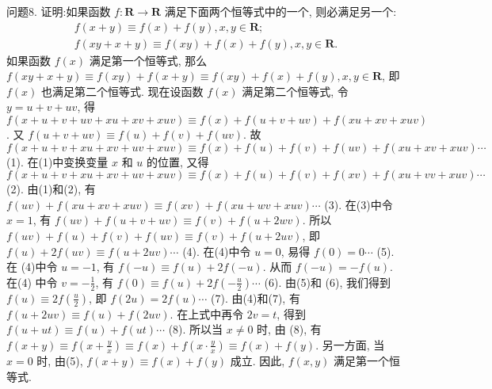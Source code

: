 问题8. 证明:如果函数 $f: \mathbf{R} \rightarrow \mathbf{R}$ 满足下面两个恒等式中的一个, 则必满足另一个:
$$
\begin{gathered}
f(x+y) \equiv f(x)+f(y), x, y \in \mathbf{R} ; \\
f(x y+x+y) \equiv f(x y)+f(x)+f(y), x, y \in \mathbf{R} .
\end{gathered}
$$
如果函数 $f(x)$ 满足第一个恒等式, 那么 $f(x y+x+y) \equiv f(x y)+ f(x+y) \equiv f(x y)+f(x)+f(y), x, y \in \mathbf{R}$, 即 $f(x)$ 也满足第二个恒等式.
现在设函数 $f(x)$ 满足第二个恒等式, 令 $y=u+v+u v$, 得 $f(x+u+v+u v+x u+x v+x u v) \equiv f(x)+f(u+v+u v)+f(x u+x v+x u v)$. 又 $f(u+ v+u v) \equiv f(u)+f(v)+f(u v)$. 故 $f(x+u+v+x u+x v+u v+x u v) \equiv f(x)+f(u)+f(v)+f(u v)+f(x u+x v+x u v) \cdots$ (1). 在(1)中变换变量 $x$ 和 $u$ 的位置, 又得 $f(x+u+v+x u+x v+u v+x u v) \equiv f(x)+f(u)+f(v)+ f(x v)+f(x u+v v+x u v) \cdots$ (2). 由(1)和(2), 有 $f(u v)+f(x u+x v+x u v) \equiv f(x v)+f(x u+w v+x u v) \cdots$ (3). 在(3)中令 $x=1$, 有 $f(u v)+f(u+v+u v) \equiv f(v)+f(u+2 w v)$. 所以 $f(u v)+f(u)+f(v)+f(u v) \equiv f(v)+f(u+2 u v)$, 即 $f(u)+2 f(u v) \equiv f(u+2 u v) \cdots$ (4). 在(4)中令 $u=0$, 易得 $f(0)=0 \cdots$ (5). 在 (4)中令 $u=-1$, 有 $f(-u) \equiv f(u)+2 f(-u)$. 从而 $f(-u)=-f(u)$. 在(4) 中令 $v=-\frac{1}{2}$, 有 $f(0) \equiv f(u)+2 f\left(-\frac{u}{2}\right) \cdots$ (6). 由(5)和 (6), 我们得到 $f(u) \equiv 2 f\left(\frac{u}{2}\right)$, 即 $f(2 u)=2 f(u) \cdots$ (7). 由(4)和(7), 有 $f(u+2 u v) \equiv f(u)+ f(2 u v)$. 在上式中再令 $2 v=t$, 得到 $f(u+u t) \equiv f(u)+f(u t) \cdots$ (8). 所以当 $x \neq 0$ 时, 由 (8), 有 $f(x+y) \equiv f\left(x+\frac{y}{x}\right) \equiv f(x)+f\left(x \cdot \frac{y}{x}\right) \equiv f(x)+ f(y)$. 另一方面, 当 $x=0$ 时, 由(5), $f(x+y) \equiv f(x)+f(y)$ 成立.
因此, $f(x, y)$ 满足第一个恒等式.



